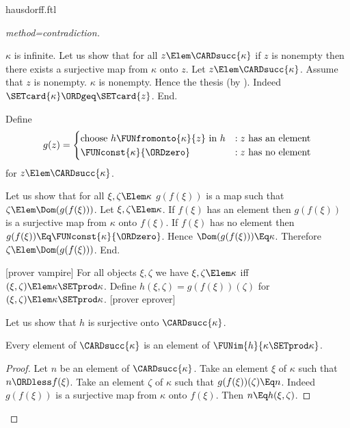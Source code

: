 \documentclass{stex}
\begin{document}
\begin{smodule}{hausdorff.ftl}
\begin{forthel}
\begin{proof}[method=contradiction]
\begin{case}{$\kappa$ is infinite.}
      Let us show that for all $z \Elem \CARDsucc{\kappa}$ if $z$ is nonempty then there exists a surjective map from $\kappa$ onto $z$.
        Let $z \Elem \CARDsucc{\kappa}$.
        Assume that $z$ is nonempty.
        $\kappa$ is nonempty.
        Hence the thesis (by ).
        Indeed $\SETcard{\kappa} \ORDgeq \SETcard{z}$.
      End.
  
      Define \[ g(z) =
        \begin{cases}
          \text{choose $h \FUNfromonto{\kappa}{z}$ in $h$}
          & : \text{$z$ has an element}
          \\
          \text{$\FUNconst{\kappa}{\ORDzero}$}
          & : \text{$z$ has no element}
        \end{cases}
      \] for $z \Elem \CARDsucc{\kappa}$.
  
      Let us show that for all $\xi, \zeta \Elem \kappa$ $g(f(\xi))$ is a map such that $\zeta \Elem\linebreak \Dom(g(f(\xi)))$.
        Let $\xi, \zeta \Elem \kappa$.
        If $f(\xi)$ has an element then $g(f(\xi))$ is a surjective map from $\kappa$ onto $f(\xi)$.
        If $f(\xi)$ has no element then $g(f(\xi)) \Eq\linebreak \FUNconst{\kappa}{\ORDzero}$.
        Hence $\Dom(g(f(\xi))) \Eq \kappa$.
        Therefore $\zeta \Elem \Dom(g(f(\xi)))$.
      End.
  
      [prover vampire]
      For all objects $\xi, \zeta$ we have $\xi, \zeta \Elem \kappa$ iff $(\xi, \zeta) \Elem \kappa \SETprod \kappa$.
      Define $h(\xi,\zeta) = g(f(\xi))(\zeta)$ for $(\xi,\zeta) \Elem \kappa \SETprod \kappa$.
      [prover eprover]

      Let us show that $h$ is surjective onto $\CARDsucc{\kappa}$.
  
        Every element of $\CARDsucc{\kappa}$ is an element of $\FUNim{h}{\kappa \SETprod \kappa}$.
        \begin{proof}
          Let $n$ be an element of $\CARDsucc{\kappa}$.
          Take an element $\xi$ of $\kappa$ such that $n \ORDless f(\xi)$.
          Take an element $\zeta$ of $\kappa$ such that $g(f(\xi))(\zeta) \Eq n$.
          Indeed $g(f(\xi))$ is a surjective map from $\kappa$ onto $f(\xi)$.
          Then $n \Eq h(\xi,\zeta)$.
        \end{proof}
  

\end{case}
\end{proof}
\end{forthel}
\end{smodule}
\end{document}
